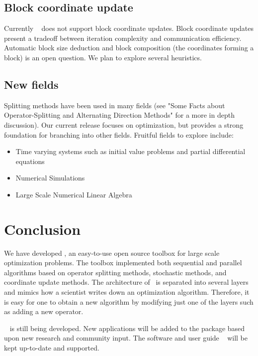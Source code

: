 \subsection{Block coordinate update}
  Currently \pkg~ does not support block coordinate updates. Block coordinate updates present a tradeoff between iteration complexity and communication efficiency.
  Automatic block size deduction and block composition (the coordinates forming a block) is an open question.
We plan to explore several heuristics.

\subsection{New fields}

Splitting methods have been used in many fields (see "Some Facts about Operator-Splitting and
Alternating Direction Methods" for a more in depth discussion).
Our current release focuses on optimization, but provides a strong foundation for branching into other fields.
Fruitful fields to explore include:

\begin{itemize}
\item Time varying systems such as initial value problems and partial differential equations
\item Numerical Simulations
\item Large Scale Numerical Linear Algebra 
\end{itemize}


\section{Conclusion }
We have developed \pkg, an easy-to-use open source toolbox for large scale optimization problems.
The toolbox implemented both sequential and parallel algorithms based on operator splitting methods, stochastic methods,
and coordinate update methods. The architecture of \pkg~is separated into several layers and mimics how a scientist writes down an optimization algorithm. Therefore, it is easy for one to obtain a new algorithm by modifying just one of the layers such as adding a new operator.


\pkg~ is still being developed. New applications will be added to the package based upon new research and community input. The software and user guide \repo~ will be kept up-to-date and supported.